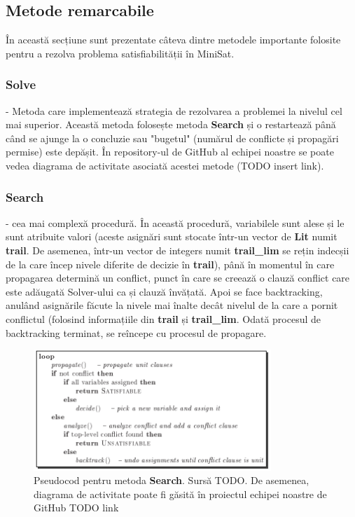 \documentclass{llncs}
\begin{document}
\subsection{Metode remarcabile}
În această secțiune sunt prezentate câteva dintre metodele importante folosite pentru a rezolva problema satisfiabilității în MiniSat.
\subsubsection{Solve} - Metoda care implementează strategia de rezolvarea a problemei la nivelul cel mai superior. Această metoda folosește metoda \textbf{Search} și o restartează până când se ajunge la o concluzie sau "bugetul" (numărul de conflicte și propagări permise) este depășit. În repository-ul de GitHub al echipei noastre se poate vedea diagrama de activitate asociată acestei metode (TODO insert link).
\subsubsection{Search} - cea mai complexă procedură. În această procedură, variabilele sunt alese și le sunt atribuite valori (aceste asignări sunt stocate într-un vector de \textbf{Lit} numit \textbf{trail}. De asemenea, într-un vector de integers numit \textbf{trail\_lim} se rețin indecșii de la care încep nivele diferite de decizie în \textbf{trail}), până în momentul în care propagarea determină un conflict, punct în care se creează o clauză conflict care este adăugată Solver-ului ca și clauză învățată. Apoi se face backtracking, anulând asignările făcute la nivele mai înalte decât nivelul de la care a pornit conflictul (folosind informațiile din \textbf{trail} și \textbf{trail\_lim}. Odată procesul de backtracking terminat, se reîncepe cu procesul de propagare.

\begin{figure}[h]
\centering
\includegraphics[width=0.8\textwidth]{resources/search_pseudocode.png}
\caption{Pseudocod pentru metoda \textbf{Search}. Sursă TODO. De asemenea, diagrama de activitate poate fi găsită în proiectul echipei noastre de GitHub TODO link}
\end{figure}
\end{document}
